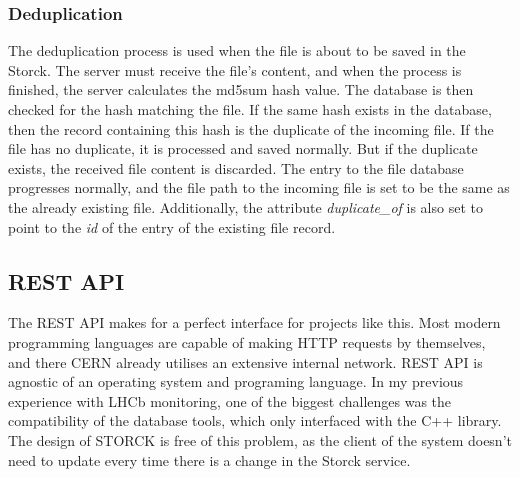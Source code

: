 \subsubsection{Deduplication}
\label{sec:deduplication}

The deduplication process is used when the file is about to be saved in the Storck.
The server must receive the file's content, and when the process is finished, the server calculates the md5sum hash value.
The database is then checked for the hash matching the file.
If the same hash exists in the database, then the record containing this hash is the duplicate of the incoming file.
If the file has no duplicate, it is processed and saved normally.
But if the duplicate exists, the received file content is discarded.
The entry to the file database progresses normally, and the file path to the incoming file is set to be the same as the already existing file.
Additionally, the attribute \textit{duplicate\_of} is also set to point to the \textit{id} of the entry of the existing file record.

\subsection{REST API}

The REST API makes for a perfect interface for projects like this.
Most modern programming languages are capable of making HTTP requests by themselves, and there CERN already utilises an extensive internal network.
REST API is agnostic of an operating system and programing language.
In my previous experience with LHCb monitoring, one of the biggest challenges was the compatibility of the database tools, which only interfaced with the C++ library.
The design of STORCK is free of this problem, as the client of the system doesn't need to update every time there is a change in the Storck service.


